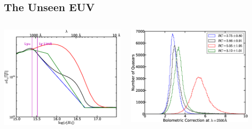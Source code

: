 \documentclass[landscape,9pt]{beamer}
\begin{document}
\subsection{The Unseen EUV}
\begin{frame}
	\begin{columns}
		\begin{column}{0.6\textwidth}
			\includegraphics[width=\textwidth]{../images/SEDs/f18a}
		\end{column}
		\begin{column}{0.6\textwidth}
			\includegraphics[width=\textwidth]{../images/SEDs/f18b}

\end{column}
\end{columns}
\end{frame}
\end{document}
